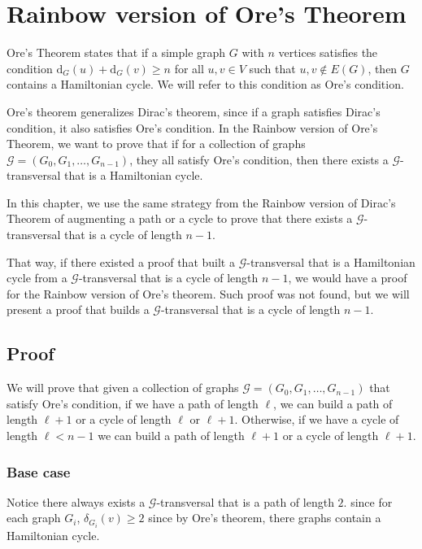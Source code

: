 
\chapter{Rainbow version of Ore's Theorem}
\label{chap:ore}

Ore's Theorem \cite{Ore_1960} states that if a simple graph $G$ with $n$ vertices satisfies the condition
$\text{d}_G(u) + \text{d}_G(v) \geq n$ for all $u, v \in V$ such that ${u, v} \not\in E(G)$, then $G$ contains a Hamiltonian cycle.
We will refer to this condition as Ore's condition.

Ore's theorem generalizes Dirac's theorem, since if a graph satisfies Dirac's condition, it also satisfies Ore's condition.
In the Rainbow version of Ore's Theorem, we want to prove that if for a collection of graphs $\mathcal{G} = (G_0, G_1, \ldots, G_{n-1})$, they all satisfy Ore's condition,
then there exists a $\mathcal{G}$-transversal that is a Hamiltonian cycle.

In this chapter, we use the same strategy from the 
Rainbow version of Dirac's Theorem of augmenting a path or a cycle   
to prove that there exists a $\mathcal{G}$-transversal that is a cycle of length $n - 1$.

That way, if there existed a proof that built a 
$\mathcal{G}$-transversal that is a Hamiltonian cycle from a
$\mathcal{G}$-transversal that is a cycle of length $n - 1$, 
we would have a proof for the Rainbow version of Ore's theorem.
Such proof was not found,
but we will present a proof that builds a $\mathcal{G}$-transversal 
that is a cycle of length $n - 1$.


\section{Proof}

We will prove that given a collection of graphs $\mathcal{G} = (G_0, G_1, \ldots, G_{n-1})$ 
that satisfy Ore's condition,
if we have a path of length $\ell$, we can build a path of length $\ell + 1$  or 
a cycle of length $\ell$ or $\ell + 1$.
Otherwise, if we have a cycle of length $\ell < n - 1$ 
we can build a path of length $\ell + 1$ or a cycle of length $\ell + 1$.

\subsection{Base case}

Notice there always exists a $\mathcal{G}$-transversal that is a path of length $2$.
since for each graph $G_i$, $\delta_{G_i}(v) \geq 2$ since by Ore's theorem,
there graphs contain a Hamiltonian cycle. 

